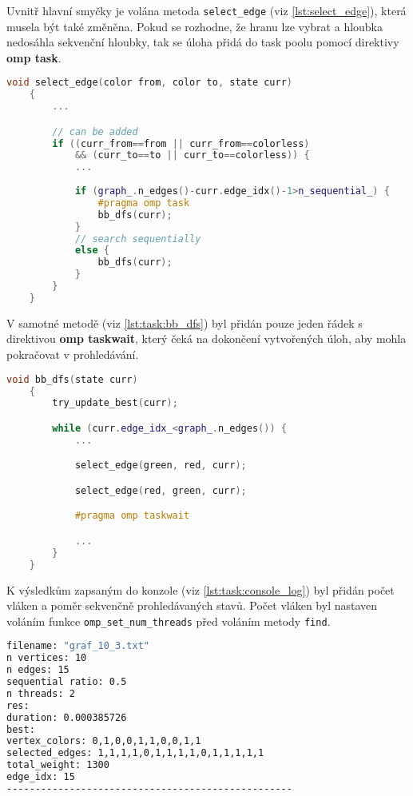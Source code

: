 Uvnitř hlavní smyčky je volána metoda \texttt{select\_edge} (viz \ref{lst:select_edge}), která musela být také změněna.
Pokud se rozhodne, že hranu lze vybrat a hloubka nedosáhla sekvenční hloubky, tak se úloha přidá do task poolu pomocí direktivy \textbf{omp task}.

\begin{lstlisting}[language=C++, label={lst:select_edge}, caption={Metoda pro označení hrany}]
    void select_edge(color from, color to, state curr)
    {
        ...

        // can be added
        if ((curr_from==from || curr_from==colorless)
            && (curr_to==to || curr_to==colorless)) {
            ...
            
            if (graph_.n_edges()-curr.edge_idx()-1>n_sequential_) {
                #pragma omp task
                bb_dfs(curr);
            }
            // search sequentially
            else {
                bb_dfs(curr);
            }
        }
    }
\end{lstlisting}

V samotné metodě (viz \ref{lst:task:bb_dfs}) byl přidán pouze jeden řádek s direktivou \textbf{omp taskwait}, který čeká na dokončení vytvořených úloh, aby mohla pokračovat v prohledávání.

\begin{lstlisting}[language=C++, label={lst:task:bb_dfs}, caption={Metoda pro prohledávání stavového prostoru}]
    void bb_dfs(state curr)
    {
        try_update_best(curr);

        while (curr.edge_idx_<graph_.n_edges()) {
            ...

            select_edge(green, red, curr);

            select_edge(red, green, curr);

            #pragma omp taskwait

            ...
        }
    }
\end{lstlisting}

K výsledkům zapsaným do konzole (viz \ref{lst:task:console_log}) byl přidán počet vláken a poměr sekvenčně prohledávaných stavů.
Počet vláken byl nastaven voláním funkce \texttt{omp\_set\_num\_threads} před voláním metody \texttt{find}.

\begin{lstlisting}[language=bash, label={lst:task:console_log}, caption={Příklad výpisu výsledků}]
filename: "graf_10_3.txt"
n vertices: 10
n edges: 15
sequential ratio: 0.5
n threads: 2
res:
duration: 0.000385726
best:
vertex_colors: 0,1,0,0,1,1,0,0,1,1
selected_edges: 1,1,1,1,0,1,1,1,1,0,1,1,1,1,1
total_weight: 1300
edge_idx: 15
--------------------------------------------------
\end{lstlisting}